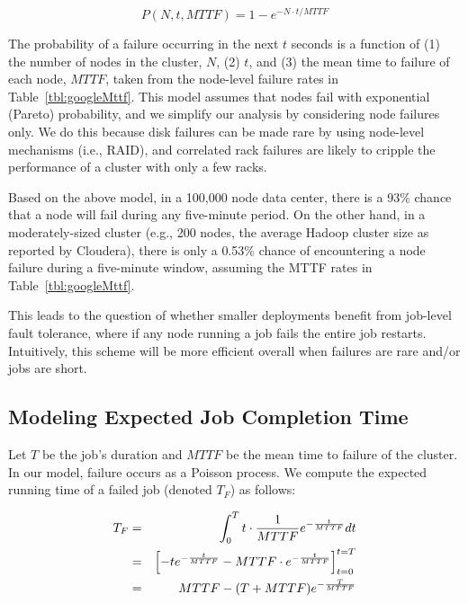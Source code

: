 \begin{equation}
P(N, t, MTTF) = 1 - e^{-N \cdot t / MTTF}
\label{eqn:jobfailure}
\end{equation}

The probability of a failure occurring in the next $t$ seconds is
a function of (1) the number of nodes in the cluster, $N$, (2) $t$, and (3) the
mean time to failure of each node, $MTTF$, taken from the node-level failure
rates in Table~\ref{tbl:googleMttf}.  This model assumes that nodes fail with
exponential (Pareto) probability, and we simplify our analysis by considering
node failures only.  We do this because disk failures can be made rare by using
node-level mechanisms (i.e., RAID), and correlated rack failures are likely to
cripple the performance of a cluster with only a few racks.

Based on the above model, in a 100,000 node data center, there is a 93\% chance
that a node will fail during any five-minute period. On the other hand, in a
moderately-sized cluster (e.g., 200 nodes, the average Hadoop cluster size as
reported by Cloudera), there is only a 0.53\% chance of encountering a node
failure during a five-minute window, assuming the MTTF rates in
Table~\ref{tbl:googleMttf}.

This leads to the question of whether smaller deployments benefit from
job-level fault tolerance, where if any node running a job fails the entire job
restarts.  Intuitively, this scheme will be more efficient overall when
failures are rare and/or jobs are short.

\subsection{Modeling Expected Job Completion Time}

Let $T$ be the job's duration and $MTTF$ be the mean time to failure of the
cluster. In our model, failure occurs as a Poisson process. We compute the
expected running time of a failed job (denoted $T_F$) as follows:

\vspace{-4mm}

\begin{eqnarray}
T_{F} &=& \int_{0}^{T} t \cdot \frac{1}{MTTF} e^{-\frac{t}{MTTF}} dt \notag \\
      &=& \left[- t e^{-\frac{t}{MTTF}} - MTTF \cdot e^{-\frac{t}{MTTF}}\right]_{t = 0}^{t = T} \notag \\
      &=& MTTF - (T + MTTF) e^{-\frac{T}{MTTF}}
\label{eqn:T_F}
\end{eqnarray}

